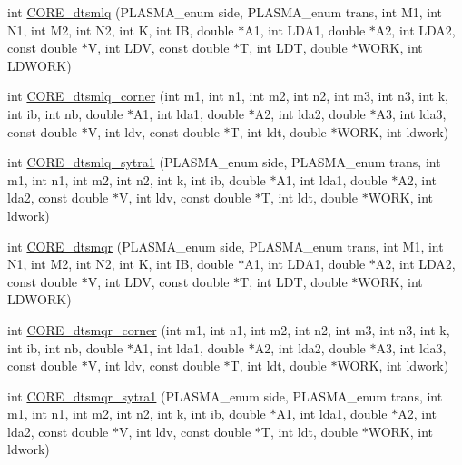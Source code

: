 \begin{DoxyCompactItemize}
\item 
int \hyperlink{group__CORE__double_gafb81efeef8942dd4b3bd85d3e58d3c8c_gafb81efeef8942dd4b3bd85d3e58d3c8c}{C\+O\+R\+E\+\_\+dtsmlq} (P\+L\+A\+S\+M\+A\+\_\+enum side, P\+L\+A\+S\+M\+A\+\_\+enum trans, int M1, int N1, int M2, int N2, int K, int I\+B, double $\ast$A1, int L\+D\+A1, double $\ast$A2, int L\+D\+A2, const double $\ast$V, int L\+D\+V, const double $\ast$T, int L\+D\+T, double $\ast$W\+O\+R\+K, int L\+D\+W\+O\+R\+K)
\item 
int \hyperlink{group__CORE__double_gab75e15e330b097d4cb04e580b526c37d_gab75e15e330b097d4cb04e580b526c37d}{C\+O\+R\+E\+\_\+dtsmlq\+\_\+corner} (int m1, int n1, int m2, int n2, int m3, int n3, int k, int ib, int nb, double $\ast$A1, int lda1, double $\ast$A2, int lda2, double $\ast$A3, int lda3, const double $\ast$V, int ldv, const double $\ast$T, int ldt, double $\ast$W\+O\+R\+K, int ldwork)
\item 
int \hyperlink{group__CORE__double_ga4efacaf4c386e7c5cef9cd111d910ad9_ga4efacaf4c386e7c5cef9cd111d910ad9}{C\+O\+R\+E\+\_\+dtsmlq\+\_\+sytra1} (P\+L\+A\+S\+M\+A\+\_\+enum side, P\+L\+A\+S\+M\+A\+\_\+enum trans, int m1, int n1, int m2, int n2, int k, int ib, double $\ast$A1, int lda1, double $\ast$A2, int lda2, const double $\ast$V, int ldv, const double $\ast$T, int ldt, double $\ast$W\+O\+R\+K, int ldwork)
\item 
int \hyperlink{group__CORE__double_gae324a24ebf7b2b6009f63454134d5824_gae324a24ebf7b2b6009f63454134d5824}{C\+O\+R\+E\+\_\+dtsmqr} (P\+L\+A\+S\+M\+A\+\_\+enum side, P\+L\+A\+S\+M\+A\+\_\+enum trans, int M1, int N1, int M2, int N2, int K, int I\+B, double $\ast$A1, int L\+D\+A1, double $\ast$A2, int L\+D\+A2, const double $\ast$V, int L\+D\+V, const double $\ast$T, int L\+D\+T, double $\ast$W\+O\+R\+K, int L\+D\+W\+O\+R\+K)
\item 
int \hyperlink{group__CORE__double_ga502c8674867dfe112ce5fc9ac8ca1be7_ga502c8674867dfe112ce5fc9ac8ca1be7}{C\+O\+R\+E\+\_\+dtsmqr\+\_\+corner} (int m1, int n1, int m2, int n2, int m3, int n3, int k, int ib, int nb, double $\ast$A1, int lda1, double $\ast$A2, int lda2, double $\ast$A3, int lda3, const double $\ast$V, int ldv, const double $\ast$T, int ldt, double $\ast$W\+O\+R\+K, int ldwork)
\item 
int \hyperlink{group__CORE__double_ga2a731f8fc79ae3f45e1d006a83c5dc6e_ga2a731f8fc79ae3f45e1d006a83c5dc6e}{C\+O\+R\+E\+\_\+dtsmqr\+\_\+sytra1} (P\+L\+A\+S\+M\+A\+\_\+enum side, P\+L\+A\+S\+M\+A\+\_\+enum trans, int m1, int n1, int m2, int n2, int k, int ib, double $\ast$A1, int lda1, double $\ast$A2, int lda2, const double $\ast$V, int ldv, const double $\ast$T, int ldt, double $\ast$W\+O\+R\+K, int ldwork)

\end{DoxyCompactItemize}
